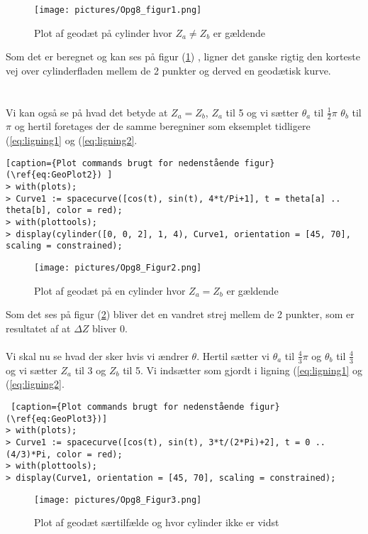 \begin{figure}[h]
\center
\texttt{[image: pictures/Opg8\_figur1.png]}  
\caption{Plot af geodæt på cylinder hvor $Z_a\neq Z_b$ er gældende }
\label{eq:GeoPlot1}
\end{figure}
Som det er beregnet og kan ses på figur  (\ref{eq:GeoPlot1}) , ligner det ganske rigtig den korteste vej over cylinderfladen mellem de 2 punkter og derved en geodætisk kurve.
\\
\\
\\
Vi kan også se på hvad det betyde at $Z_a=Z_b$, $Z_a$ til 5 og vi sætter $\theta_a$ til $\frac{1}{2}\pi$ $\theta_b$ til $\pi$ og hertil foretages der de samme beregniner som eksemplet tidligere (\ref{eq:ligning1} og (\ref{eq:ligning2}.
\begin{lstlisting}[caption={Plot commands brugt for nedenstående figur}(\ref{eq:GeoPlot2}) ]
> with(plots);
> Curve1 := spacecurve([cos(t), sin(t), 4*t/Pi+1], t = theta[a] .. theta[b], color = red);
> with(plottools);
> display(cylinder([0, 0, 2], 1, 4), Curve1, orientation = [45, 70], scaling = constrained);

\end{lstlisting}
\begin{figure}[h]
\center
\texttt{[image: pictures/Opg8\_Figur2.png]}
\caption{Plot af geodæt på en cylinder hvor $Z_a=Z_b$ er gældende}
\label{eq:GeoPlot2}
\end{figure}
Som det ses på figur (\ref{eq:GeoPlot2}) bliver det en vandret strej mellem de 2 punkter, som er resultatet af at $\Delta Z$ bliver 0.
\\
\\
Vi skal nu se hvad der sker hvis vi ændrer $\theta$. Hertil sætter vi $\theta_a$ til $\frac{4}{3} \pi$ og $\theta_b$ til $\frac{4}{3}$ og vi sætter $Z_a$ til 3 og $Z_b$ til 5. Vi indsætter som gjordt i ligning (\ref{eq:ligning1} og (\ref{eq:ligning2}.
\begin{lstlisting} [caption={Plot commands brugt for nedenstående figur}(\ref{eq:GeoPlot3})]
> with(plots);
> Curve1 := spacecurve([cos(t), sin(t), 3*t/(2*Pi)+2], t = 0 .. (4/3)*Pi, color = red);
> with(plottools);
> display(Curve1, orientation = [45, 70], scaling = constrained);
\end{lstlisting}
\begin{figure}[h] 
\center
\texttt{[image: pictures/Opg8\_Figur3.png]}
\caption{Plot af geodæt særtilfælde og hvor cylinder ikke er vidst}
\label{eq:GeoPlot3}
\end{figure}
